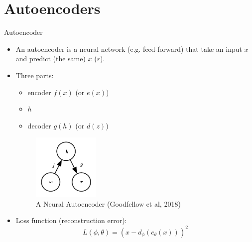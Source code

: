 \documentclass[10pt]{beamer}
\begin{document}

\section{Autoencoders}
\frame{\sectionpage}

\begin{frame}{Autoencoder}

\begin{itemize}
\item An autoencoder is a neural network (e.g. feed-forward) that take an input $x$ and predict (the same) $x$ ($r$). \pause
\item Three parts:
\begin{itemize}
\item {\color{uured}encoder} $f(x)$ (or $e(x)$)
\item {} $h$
\item {\color{uured}decoder} $g(h)$ (or $d(z)$)
\end{itemize}

\begin{figure}[h]
\centering
\includegraphics[width=0.3\textwidth]{fig/DL_14_1_ae}
\caption{A Neural Autoencoder (Goodfellow et al, 2018)}
\end{figure}

\pause

\item Loss function ({\color{uured}reconstruction error}):
\[
L(\phi, \theta) = (x - d_\phi(e_\theta(x)))^2
\]
\end{itemize}

\end{frame}
\end{document}
